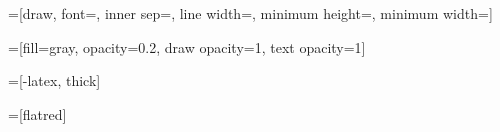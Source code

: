 \newlength{\vertexinnersep}
\setlength{\vertexinnersep}{2pt}
\newlength{\vertexlinewidth}
\setlength{\vertexlinewidth}{1pt}
\newlength{\vertexwidth}
\newcommand{\graphindexcolor}{flatred}
\newcommand{\cmdi}{$a \gets 0$}
\newcommand{\cmdii}{$b \gets 0$}
\newcommand{\cmdiii}{$a \gets b$}
\newcommand{\xscale}{0.75}
\newcommand{\yscale}{0.75}

=[draw,
                    font=\scriptsize,
                    inner sep=\vertexinnersep,
                    line width=\vertexlinewidth,
                    minimum height=\vertexwidth,
                    minimum width=\vertexwidth]

=[fill=gray, opacity=0.2, draw opacity=1, text opacity=1]

=[-latex, thick]

=[\graphindexcolor]

